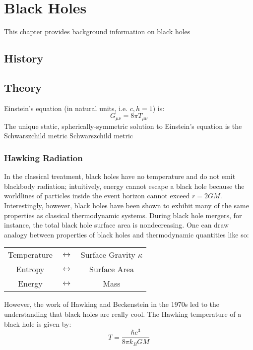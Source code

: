 \chapter[Black Holes]{Black Holes}
This chapter provides background information on black holes

\section{History}

\section{Theory}
Einstein's equation (in natural units, i.e. $c, h = 1$) is:
\begin{equation}
G_{\mu\nu} = 8\pi T_{\mu\nu}
\end{equation}
The unique static, spherically-symmetric solution to Einstein's equation is the Schwarszchild metric
Schwarszchild metric
\subsection{Hawking Radiation}
In the classical treatment, black holes have no temperature and do not emit blackbody radiation; intuitively, energy cannot escape a black hole because the worldlines of particles inside the event horizon cannot exceed $r=2GM$. 
Interestingly, however, black holes have been shown to exhibit many of the same properties as classical thermodynamic systems.
During black hole mergers, for instance, the total black hole surface area is nondecreasing.
One can draw analogy between properties of black holes and thermodynamic quantities like so:
\begin{tabular}{ccc}


Temperature & $\longleftrightarrow$ & Surface Gravity $\kappa$\\
Entropy & $\longleftrightarrow$ & Surface Area\\
Energy & $\longleftrightarrow$  & Mass\\

\end{tabular}

However, the work of Hawking and Beckenstein in the 1970s led to the understanding that black holes are really cool.
The Hawking temperature of a black hole is given by:
\begin{equation}
T = \frac{\hbar c^3}{8\pi k_B GM}
\end{equation}


